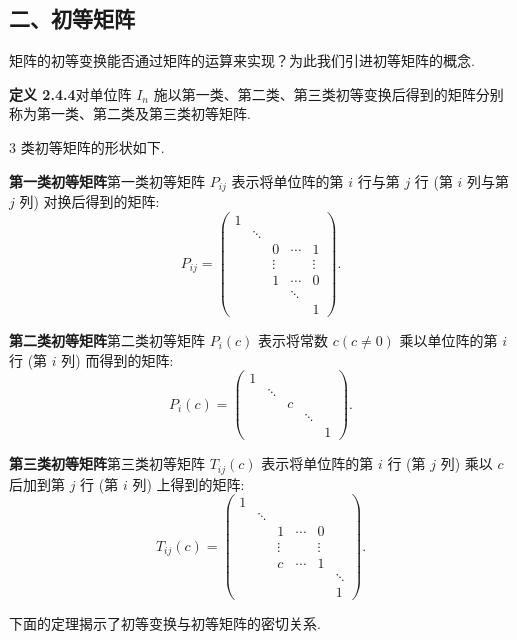 \documentclass[UTF8,12pt,a4paper,fontset=fandol]{ctexart}
\begin{document}
\subsection*{二、初等矩阵}

矩阵的初等变换能否通过矩阵的运算来实现？为此我们引进初等矩阵的概念.

\noindent\textbf{定义 2.4.4}\quad 对单位阵 $I_n$ 施以第一类、第二类、第三类初等变换后得到的矩阵分别称为第一类、第二类及第三类初等矩阵.

3 类初等矩阵的形状如下.

\noindent\textbf{第一类初等矩阵}\quad 第一类初等矩阵 $P_{ij}$ 表示将单位阵的第 $i$ 行与第 $j$ 行 (第 $i$ 列与第 $j$ 列) 对换后得到的矩阵:
\[
P_{ij}=\left(\begin{array}{ccccc}
1 & & & &\\
& \ddots & & &\\
& & 0 & \cdots & 1\\
& & \vdots & & \vdots\\
& & 1 & \cdots & 0\\
& & & \ddots &\\
& & & & 1
\end{array}\right).
\]

\noindent\textbf{第二类初等矩阵}\quad 第二类初等矩阵 $P_i(c)$ 表示将常数 $c(c\ne 0)$ 乘以单位阵的第 $i$ 行 (第 $i$ 列) 而得到的矩阵:
\[
P_i(c)=\left(\begin{array}{ccccc}
1 & & & &\\
& \ddots & & &\\
& & c & &\\
& & & \ddots &\\
& & & & 1
\end{array}\right).
\]

\noindent\textbf{第三类初等矩阵}\quad 第三类初等矩阵 $T_{ij}(c)$ 表示将单位阵的第 $i$ 行 (第 $j$ 列) 乘以 $c$ 后加到第 $j$ 行 (第 $i$ 列) 上得到的矩阵:
\[
T_{ij}(c)=\left(\begin{array}{cccccc}
1 & & & & &\\
& \ddots & & & &\\
& & 1 & \cdots & 0 &\\
& & \vdots & & \vdots &\\
& & c & \cdots & 1 &\\
& & & & & \ddots\\
& & & & & 1
\end{array}\right).
\]

下面的定理揭示了初等变换与初等矩阵的密切关系.
\end{document}
